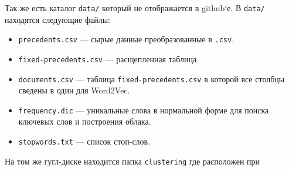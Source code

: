 \documentclass{article}
\begin{document}
Так же есть каталог \texttt{data/} который не отображается в github`е. 
В \texttt{data/} находятся следующие файлы:
\begin{itemize}
    \item \texttt{precedents.csv} --- сырые данные преобразованные в \texttt{.csv}.
    \item \texttt{fixed-precedents.csv} --- расщепленная таблица. 
    \item \texttt{documents.csv} --- таблица \texttt{fixed-precedents.csv} в которой все столбцы сведены в один для Word2Vec.
    \item \texttt{frequency.dic} --- уникальные слова в нормальной форме для поиска ключевых слов и построения облака.  
    \item \texttt{stopwords.txt} --- список стоп-слов.
\end{itemize}

На том же гугл-диске находится папка \texttt{clustering} где расположен при
\end{document}
